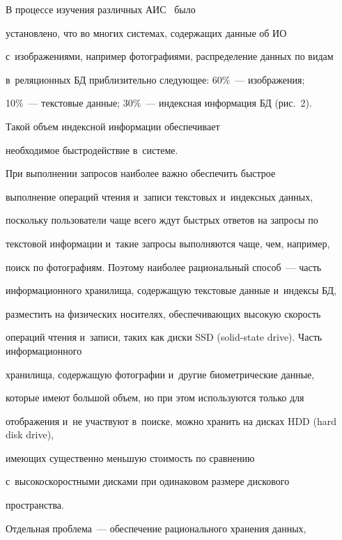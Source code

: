             


      В процессе изучения различных АИС~\cite{9-bir, 10-bir} было 


установлено, что во многих системах, содержащих данные об ИО 


с~изображениями, например фотографиями, распределение данных по видам 


в~реляционных БД приблизительно следующее: 60\%~--- изображения;  


10\%~--- текс\-то\-вые данные; 30\%~--- индексная инфор\-ма\-ция БД (рис.~2). 


Такой объем индексной информации обеспечивает 


необходимое быстродействие в~сис\-теме. 


      








       При выполнении запросов наиболее важно обеспечить быстрое 


выполнение операций чтения и~записи текстовых и~индексных данных, 


поскольку пользователи чаще всего ждут быстрых ответов на запросы по 


текстовой информации и~такие запросы выполняются чаще, чем, например, 


поиск по фотографиям. Поэтому наиболее рациональный способ~--- часть 


информационного хранилища, содержащую текстовые данные и~индексы БД, 


разместить на физических носителях, обеспечивающих высокую скорость 


операций чтения и~записи, таких как диски SSD (solid-state drive). Часть информационного 


хранилища, содержащую фотографии и~другие биометрические данные, 


которые имеют большой объем, но при этом используются только для 


отображения и~не участвуют в~поиске, можно хранить на дисках HDD (hard disk drive), 


имеющих существенно меньшую стоимость по сравнению 


с~высокоскоростными дисками при одинаковом размере дискового 


пространства.


      


      Отдельная проблема~--- обеспечение рационального хранения данных, 


